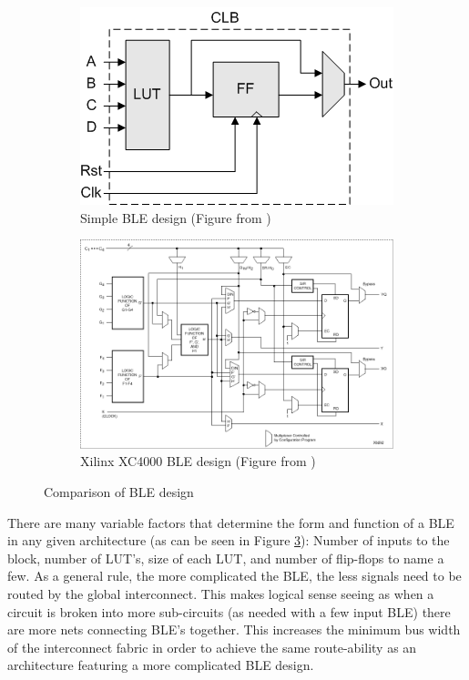 \documentclass[12pt]{article}
\begin{document}
\begin{figure}[ht]
\centering
\begin{subfigure}{.5\textwidth}
    \centering
    \includegraphics[width=.95\textwidth]{simple_ble}
    \caption{Simple BLE design (Figure from \cite{simple_ble})}
    \label{fig:simple_ble}
\end{subfigure}%
\begin{subfigure}{.5\textwidth}
  \centering
  \includegraphics[width=.95\textwidth]{complex_ble}
  \caption{Xilinx XC4000 BLE design (Figure from \cite{xilinx_xc4000})}
  \label{fig:complex_ble}
\end{subfigure}
\caption{Comparison of BLE design}
\label{fig:compare_ble}
\end{figure}

There are many variable factors that determine the form and function of a BLE in 
any given architecture (as can be seen in Figure \ref{fig:compare_ble}): Number of inputs to the block, number of LUT’s, size of each 
LUT, and number of flip-flops to name a few. As a general rule, the more complicated 
the BLE, the less signals need to be routed by the global interconnect. This makes 
logical sense seeing as when a circuit is broken into more sub-circuits (as needed 
with a few input BLE) there are more nets connecting BLE’s together. This increases 
the minimum bus width of the interconnect fabric in order to achieve the same route-ability 
as an architecture featuring a more complicated BLE design.
\end{document}
